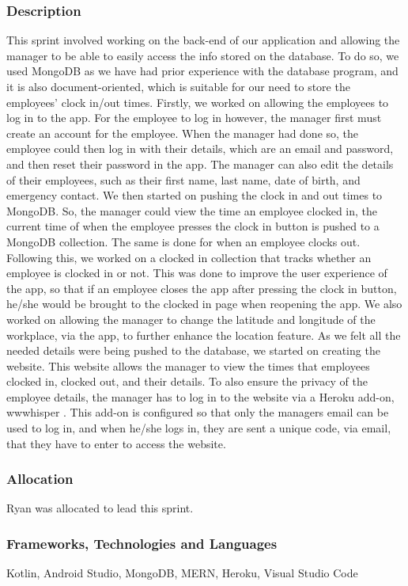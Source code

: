 \subsubsection{Description}
This sprint involved working on the back-end of our application and allowing the manager to be able to easily access the info stored on the database. To do so, we used MongoDB as we have had prior experience with the database program, and it is also document-oriented, which is suitable for our need to store the employees’ clock in/out times.
Firstly, we worked on allowing the employees to log in to the app. For the employee to log in however, the manager first must create an account for the employee. When the manager had done so, the employee could then log in with their details, which are an email and password, and then reset their password in the app. The manager can also edit the details of their employees, such as their first name, last name, date of birth, and emergency contact.
We then started on pushing the clock in and out times to MongoDB. So, the manager could view the time an employee clocked in, the current time of when the employee presses the clock in button is pushed to a MongoDB collection. The same is done for when an employee clocks out.
Following this, we worked on a clocked in collection that tracks whether an employee is clocked in or not. This was done to improve the user experience of the app, so that if an employee closes the app after pressing the clock in button, he/she would be brought to the clocked in page when reopening the app. 
We also worked on allowing the manager to change the latitude and longitude of the workplace, via the app, to further enhance the location feature.
As we felt all the needed details were being pushed to the database, we started on creating the website. This website allows the manager to view the times that employees clocked in, clocked out, and their details. To also ensure the privacy of the employee details, the manager has to log in to the website via a Heroku add-on, wwwhisper \cite{wwwhisper}. This add-on is configured so that only the managers email can be used to log in, and when he/she logs in, they are sent a unique code, via email, that they have to enter to access the website.
\subsubsection{Allocation}
Ryan was allocated to lead this sprint.
\subsubsection{Frameworks, Technologies and Languages}
Kotlin, Android Studio, MongoDB, MERN, Heroku, Visual Studio Code
